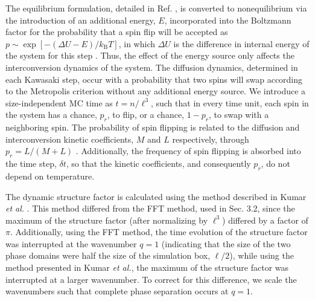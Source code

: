 \documentclass[5p,twocolumn]{elsarticle}
\begin{document}
The equilibrium formulation, detailed in Ref. \cite{Shum_Phase_2021}, is converted to nonequilibrium via the introduction of an additional energy, $E$, incorporated into the Boltzmann factor for the probability that a spin flip will be accepted as $p\sim \exp\left[-(\Delta U-E)/k_\text{B}T\right]$, in which $\Delta U$ is the difference in internal energy of the system for this step \cite{metropolis_basic_1963}. Thus, the effect of the energy source only affects the interconversion dynamics of the system. The diffusion dynamics, determined in each Kawasaki step, occur with a probability that two spins will swap according to the Metropolis criterion without any additional energy source. We introduce a size-independent MC time as $t = n/\ell^3$, such that in every time unit, each spin in the system has a chance, $p_r$, to flip, or a chance, $1-p_r$, to swap with a neighboring spin. The probability of spin flipping is related to the diffusion and interconversion kinetic coefficients, $M$ and $L$ respectively, through $p_r = L/(M+L)$ \cite{Shum_Phase_2021}. Additionally, the frequency of spin flipping is absorbed into the time step, $\delta t$, so that the kinetic coefficients, and consequently $p_r$, do not depend on temperature. 

The dynamic structure factor is calculated using the method described in Kumar \textit{et al.} \cite{Kumar_Static_2005}. This method differed from the FFT method, used in Sec. 3.2, since the maximum of the structure factor (after normalizing by $\ell^3$) differed by a factor of $\pi$. Additionally, using the FFT method, the time evolution of the structure factor was interrupted at the wavenumber $q=1$ (indicating that the size of the two phase domains were half the size of the simulation box, $\ell/2$), while using the method presented in Kumar \textit{et al.}, the maximum of the structure factor was interrupted at a larger wavenumber. To correct for this difference, we scale the wavenumbers such that complete phase separation occurs at $q=1$.
\end{document}
